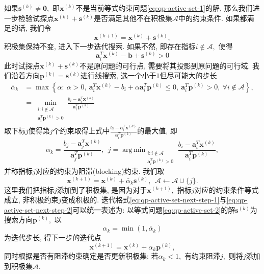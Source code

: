 \documentclass{SBCbookchapter}
\newcommand{\V}[1]{{\bm{#1}}}
\DeclareMathOperator*{\argmin}{arg\,min}
\numberwithin{equation}{section}
\begin{document}
如果$\V{s}^{(k)} \neq \V{0},$ 即$\V{x}^{(k)}$不是当前等式约束问题\eqref{eq:qp-active-set-1}的解, 那么我们进一步检验试探点$\V{x}^{(k)} + \V{s}^{(k)}$是否满足其他不在积极集$\mathcal{A}$中的约束条件. 如果都满足的话, 我们令
\begin{equation}
\label{eq:qp-active-set-next-step-1}
\V{x}^{(k+1)} = \V{x}^{(k)} + \V{s}^{(k)},
\end{equation}
积极集保持不变, 进入下一步迭代搜索. 如果不然, 即存在指标$i \not\in \mathcal{A},$ 使得
\begin{equation*}
\V{a}_i^T \V{x}^{(k)} - \V{b} + \V{s}^{(k)} > 0
\end{equation*}
此时试探点$\V{x}^{(k)} + \V{s}^{(k)}$不是原问题的可行点, 需要将其投影到原问题的可行域. 我们沿着方向$\V{p}^{(k)} = \V{s}^{(k)}$进行线搜索, 选一个小于$1$但尽可能大的步长
\begin{equation}
\label{eq:qp-active-set-step-len-1}
\begin{aligned}
\bar{\alpha}_k & = \max \left\{ \alpha : ~ \alpha > 0, ~ \V{a}_i^T \V{x}^{(k)} - b_i + \alpha \V{a}_i^T \V{p}^{(k)} \leqslant 0, ~ \V{a}_i^T \V{p}^{(k)} > 0, ~ \forall i \not\in \mathcal{A} \right\}, \\
& = \min_{\substack{i: i \not\in \mathcal{A} \\ \V{a}_i^T \V{p}^{(k)} > 0}} \frac{b_i - \V{a}_i^T \V{x}^{(k)}}{\V{a}_i^T \V{p}^{(k)}}
\end{aligned}
\end{equation}
取下标$j$使得第$j$个约束取得上式中$\frac{b_i - \V{a}_i^T \V{x}^{(k)}}{\V{a}_i^T \V{p}^{(k)}}$的最大值, 即
\begin{equation}
\label{eq:qp-active-set-step-len-2}
\bar{\alpha}_k = \frac{b_j - \V{a}_j^T \V{x}^{(k)}}{\V{a}_j^T \V{p}^{(k)}}, ~~ j = \argmin_{\substack{i: i \not\in \mathcal{A} \\ \V{a}_i^T \V{p}^{(k)} > 0}} \frac{b_i - \V{a}_i^T \V{x}^{(k)}}{\V{a}_i^T \V{p}^{(k)}},
\end{equation}
并称指标$j$对应的约束为阻滞(blocking)约束. 我们取
\begin{equation}
\label{eq:qp-active-set-next-step-2}
\V{x}^{(k+1)} = \V{x}^{(k)} + \bar{\alpha}_k \V{s}^{(k)}, ~~ \mathcal{A} \gets \mathcal{A} \cup \{ j \}.
\end{equation}
这里我们把指标$j$添加到了积极集, 是因为对于$\V{x}^{(k+1)},$ 指标$j$对应的约束条件等式成立, 非积极约束$j$变成积极的. 迭代格式\eqref{eq:qp-active-set-next-step-1}与\eqref{eq:qp-active-set-next-step-2}可以统一表述为: 以等式问题\eqref{eq:qp-active-set-2}的解$\V{s}^{(k)}$为搜索方向$\V{p}^{(k)},$ 以
\begin{equation}
\label{eq:qp-active-set-step-len-uniform}
\alpha_k = \min (1, \bar{\alpha}_k)
\end{equation}
为迭代步长, 得下一步的迭代点
\begin{equation}
\label{eq:qp-active-set-next-step-uniform}
\V{x}^{(k+1)} = \V{x}^{(k)} + \alpha_k \V{p}^{(k)},
\end{equation}
同时根据是否有阻滞约束确定是否更新积极集: 若$\alpha_k < 1,$ 有约束阻滞$j,$ 则将$j$添加到积极集$\mathcal{A}.$
\end{document}
